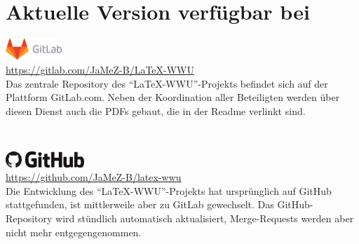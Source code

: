 \section*{Aktuelle Version verfügbar bei}
\newcommand{\dieBreite}{11cm}
\begin{minipage}{4cm}
\end{minipage}
\hfill
\begin{minipage}{\dieBreite}
	\includegraphics[height=0.8cm, keepaspectratio]{../!config/Bilder/wm_no_bg.pdf}\\
	\url{https://gitlab.com/JaMeZ-B/LaTeX-WWU} \smallskip\\
	Das zentrale Repository des \enquote{\LaTeX-WWU}-Projekts befindet sich auf der Plattform GitLab.com.
	Neben der Koordination aller Beteiligten werden über diesen Dienst auch die PDFs gebaut, die in der Readme verlinkt sind.
\end{minipage}\\[1cm]
\begin{minipage}{4cm}
\end{minipage}
\hfill
\begin{minipage}{\dieBreite}
	\includegraphics[height=0.6cm, keepaspectratio]{../!config/Bilder/github_octo.pdf}
	\includegraphics[height=0.6cm, keepaspectratio]{../!config/Bilder/GitHub_Logo.pdf}\\
	\url{https://github.com/JaMeZ-B/latex-wwu} \smallskip\\
	Die Entwicklung des \enquote{\LaTeX-WWU}-Projekts hat ursprünglich auf GitHub stattgefunden, ist mittlerweile aber zu GitLab gewechselt.
	Das GitHub-Repository wird stündlich automatisch aktualisiert, Merge-Requests werden aber nicht mehr entgegengenommen.
\end{minipage}\\[1cm]
